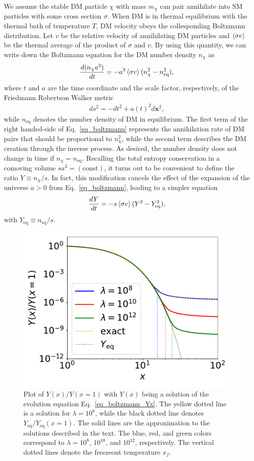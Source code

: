 \documentclass[12pt,twoside,book]{article}
\begin{document}
We assume the stable DM particle $\chi$ with mass $m_\chi$ can pair
annihilate into SM particles with some cross section $\sigma$.  When DM
is in thermal equilibrium with the thermal bath of temperature $T$, DM
velocity obeys the collesponding Boltzmann distribution.  Let $v$ be the
relative velocity of annihilating DM particles and $\Braket{\sigma v}$
be the thermal average of the product of $\sigma$ and $v$.  By using
this quantity, we can write down the Boltzmann equation for the DM
number density $n_\chi$ as
\begin{align}
 \frac{d (n_\chi a^3)}{d t} =
 - a^3 \Braket{\sigma v} (n_\chi^2 - n_{\mathrm{eq}}^2),\label{eq_boltzmann}
\end{align}
where $t$ and $a$ are the time coordinate and the scale factor,
respectively, of the Friedmann Robertson Walker metric
\begin{align}
 d s^2 = - d t^2 + a(t)^2 d \bm{x}^2,
\end{align}
while $n_{\mathrm{eq}}$ denotes the number density of DM in
equilibrium.  The first term of the right handed-side of
Eq.~\eqref{eq_boltzmann} represents the annihilation rate of DM pairs
that should be proportional to $n_\chi^2$, while the second term
describes the DM creation through the inverse process.  As desired,
the number density does not change in time if $n_\chi =
n_{\mathrm{eq}}$.  Recalling the total entropy conservation in a
comoving volume $s a^3 = (\mathrm{const})$, it turns out to be
convenient to define the ratio $Y \equiv n_\chi / s$.  In fact, this
modification cancels the effect of the expansion of the universe
$\dot{a} > 0$ from Eq.~\eqref{eq_boltzmann}, leading to a simpler
equation
\begin{align}
 \frac{d Y}{d t} =
 -s \Braket{\sigma v} (Y^2 - Y_{\mathrm{eq}}^2),\label{eq_boltzmann_Yt}
\end{align}
with $Y_{\mathrm{eq}} \equiv n_{\mathrm{eq}} / s$.

\begin{figure}[t]
 \centering \includegraphics[width=0.5\hsize]{figure/DMrelic.pdf}
 \caption{Plot of $Y(x) / Y(x=1)$ with $Y(x)$ being a solution of the
 evolution equation Eq.~\eqref{eq_boltzmann_Yx}.  The yellow dotted line
 is a solution for $\lambda = 10^{8}$, while the black dotted line
 denotes $Y_{\mathrm{eq}} / Y_{\mathrm{eq}} (x=1)$.  The solid lines are
 the approximation to the solutions described in the text.  The blue,
 red, and green colors correspond to $\lambda = 10^8$, $10^{10}$, and
 $10^{12}$, respectively.  The vertical dotted lines denote the
 freezeout temperature $x_f$.}  \label{fig_DM_relic}
\end{figure}
\end{document}
